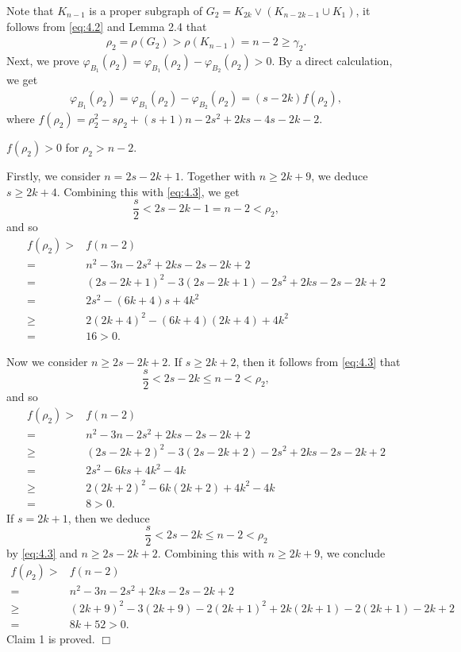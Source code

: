 \documentclass[10pt]{article}
\numberwithin{equation}{section}
\begin{document}
Note that $K_{n-1}$ is a proper subgraph of $G_2=K_{2k}\vee(K_{n-2k-1}\cup K_1)$, it follows from \eqref{eq:4.2} and Lemma 2.4 that
\begin{align}\label{eq:4.3}
\rho_2=\rho(G_2)>\rho(K_{n-1})=n-2\geq\gamma_2.
\end{align}
Next, we prove $\varphi_{B_1}(\rho_2)=\varphi_{B_1}(\rho_2)-\varphi_{B_2}(\rho_2)>0$. By a direct calculation, we get
\begin{align}\label{eq:4.4}
\varphi_{B_1}(\rho_2)=\varphi_{B_1}(\rho_2)-\varphi_{B_2}(\rho_2)=(s-2k)f(\rho_2),
\end{align}
where $f(\rho_2)=\rho_2^{2}-s\rho_2+(s+1)n-2s^{2}+2ks-4s-2k-2$.

 $f(\rho_2)>0$ for $\rho_2>n-2$.

 Firstly, we consider $n=2s-2k+1$. Together with $n\geq2k+9$, we deduce $s\geq2k+4$. Combining this with \eqref{eq:4.3}, we get
$$
\frac{s}{2}<2s-2k-1=n-2<\rho_2,
$$
and so
\begin{align*}
f(\rho_2)>&f(n-2)\\
=&n^{2}-3n-2s^{2}+2ks-2s-2k+2\\
=&(2s-2k+1)^{2}-3(2s-2k+1)-2s^{2}+2ks-2s-2k+2\\
=&2s^{2}-(6k+4)s+4k^{2}\\
\geq&2(2k+4)^{2}-(6k+4)(2k+4)+4k^{2}\\
=&16>0.
\end{align*}

Now we consider $n\geq2s-2k+2$. If $s\geq2k+2$, then it follows from \eqref{eq:4.3} that
$$
\frac{s}{2}<2s-2k\leq n-2<\rho_2,
$$
and so
\begin{align*}
f(\rho_2)>&f(n-2)\\
=&n^{2}-3n-2s^{2}+2ks-2s-2k+2\\
\geq&(2s-2k+2)^{2}-3(2s-2k+2)-2s^{2}+2ks-2s-2k+2\\
=&2s^{2}-6ks+4k^{2}-4k\\
\geq&2(2k+2)^{2}-6k(2k+2)+4k^{2}-4k\\
=&8>0.
\end{align*}
If $s=2k+1$, then we deduce
$$
\frac{s}{2}<2s-2k\leq n-2<\rho_2
$$
by \eqref{eq:4.3} and $n\geq2s-2k+2$. Combining this with $n\geq2k+9$, we conclude
\begin{align*}
f(\rho_2)>&f(n-2)\\
=&n^{2}-3n-2s^{2}+2ks-2s-2k+2\\
\geq&(2k+9)^{2}-3(2k+9)-2(2k+1)^{2}+2k(2k+1)-2(2k+1)-2k+2\\
=&8k+52>0.
\end{align*}
Claim 1 is proved. \hfill $\Box$
\end{document}
